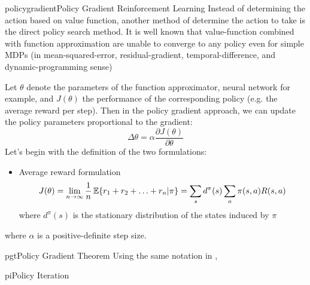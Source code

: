 \documentclass[9pt]{article}
\begin{document}
\begin{topic}{policygradient}{Policy Gradient Reinforcement Learning}
Instead of determining the action based on value function, another method of determine the action to take is the direct policy search method. It is well known that value-function combined with function approximation are unable to converge to any policy even for simple MDPs (in mean-squared-error, residual-gradient, temporal-difference, and dynamic-programming sense) \lackcite 

Let \(\theta\) denote the parameters of the function approximator, neural network for example, and \(J(\theta)\) the performance of the corresponding policy (e.g. the average reward per step). Then in the policy gradient approach, we can update the policy parameters proportional to the gradient:
\[
\Delta\theta = \alpha \frac{\partial J(\theta)}{\partial \theta}
\]
Let's begin with the definition of the two formulations:
\begin{itemize}
\item Average reward formulation\\
\[
J(\theta) = \lim_{n\rightarrow \infty} \frac{1}{n} \operatorname{\mathbb{E}}\{r_1 + r_2 + \ldots + r_n | \pi\} = \sum_s d^{\pi}(s) \sum_a \pi(s,a) R(s,a)
\]
where \(d^{\pi}(s)\) is the stationary distribution of the states induced by \(\pi\)
\end{itemize}
where \(\alpha\) is a positive-definite step size.
\end{topic}

\begin{topic}{pgt}{Policy Gradient Theorem} 
Using the same notation in , 
\end{topic}

\begin{topic}{pi}{Policy Iteration}
\Working
\end{topic}
\end{document}
